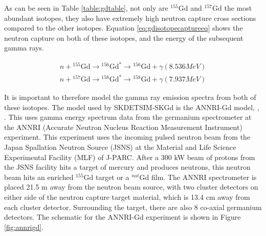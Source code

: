 As can be seen in Table \ref{table:gdtable}, not only are ${ }^{155} \mathrm{Gd}$ and ${ }^{157} \mathrm{Gd}$ the most abundant isotopes, they also have extremely high neutron capture cross sections compared to the other isotopes. Equation \ref{eq:gdisotopecaptureeq} shows the neutron capture on both of these isotopes, and the energy of the subsequent gamma rays.

\begin{equation}
\begin{split}
 {n}+{ }^{155} \mathrm{Gd} \rightarrow{ }^{156} \mathrm{Gd}^{*} \rightarrow{ }^{156} \mathrm{Gd}+\gamma  (8.536 MeV)\\
 {n}+{ }^{157} \mathrm{Gd} \rightarrow{ }^{158} \mathrm{Gd}^{*} \rightarrow{ }^{158} \mathrm{Gd}+\gamma  (7.937 MeV)
\end{split}
\label{eq:gdisotopecaptureeq}    
\end{equation}




It is important to therefore model the gamma ray emission spectra from both of these isotopes. The model used by SKDETSIM-SKGd is the ANNRI-Gd model, \cite{10.1093/ptep/ptz002}, \cite{tanaka_gamma_2020}. This uses gamma energy spectrum data from the germanium spectrometer at the ANNRI (Accurate Neutron Nucleus Reaction Measurement Instrument) experiment. This experiment uses the incoming pulsed neutron beam from the Japan Spallation Neutron Source (JSNS) at the Material and Life Science Experimental Facility (MLF) of J-PARC. After a 300 kW beam of protons from the JSNS facility hits a target of mercury and produces neutrons, this neutron beam hits an enriched ${ }^{155} \mathrm{Gd}$ target or a ${ }^{nat} \mathrm{Gd}$ film. The ANNRI spectrometer is placed 21.5 m away from the neutron beam source, with two cluster detectors on either side of the neutron capture target material, which is 13.4 cm away from each cluster detector. Surrounding the target, there are also 8 co-axial germanium detectors. The schematic for the ANNRI-Gd experiment is shown in Figure \ref{fig:annrigd}.

